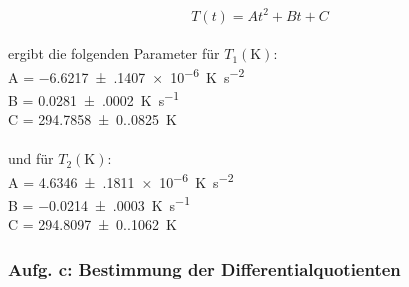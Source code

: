 \begin{equation} 
  T(t) = At^2 + Bt + C 
\end{equation}
\\
ergibt die folgenden Parameter für $T_{1} (\unit{\kelvin})$: \\
A = \qty{-6.6217(1407)e-6}{\unit[per-mode=reciprocal]{\kelvin\per\second\squared}} \\
B = \qty{0.0281(0002)}{\unit[per-mode=reciprocal]{\kelvin\per\second}} \\
C = \qty{294.7858(0.0825)}{\unit\kelvin} \\
\\
und für $T_{2} (\unit{\kelvin})$: \\
A = \qty{4.6346(1811)e-6}{\unit[per-mode=reciprocal]{\kelvin\per\second\squared}} \\
B = \qty{-0.0214(0003)}{\unit[per-mode=reciprocal]{\kelvin\per\second}} \\
C = \qty{294.8097(0.1062)}{\unit\kelvin} \\




\subsubsection{Aufg. c: Bestimmung der Differentialquotienten}

